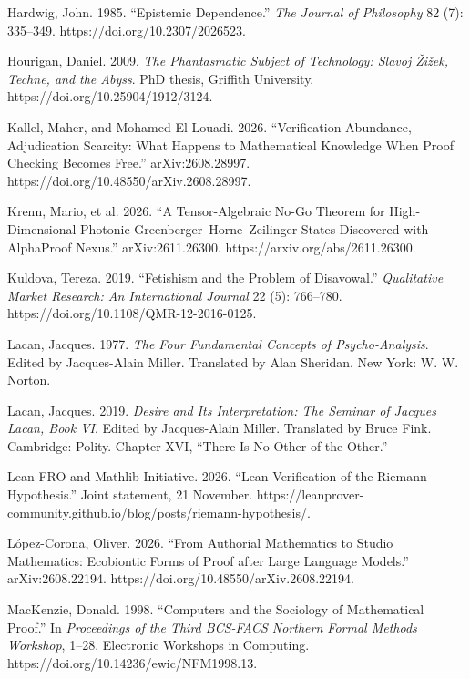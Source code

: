 \documentclass[sn-apa]{sn-jnl}
\begin{document}
\noindent\hangindent=0.5in Hardwig, John. 1985. “Epistemic Dependence.” \emph{The Journal of Philosophy} 82 (7): 335–349. https://doi.org/10.2307/2026523.\par\medskip
\noindent\hangindent=0.5in Hourigan, Daniel. 2009. \emph{The Phantasmatic Subject of Technology: Slavoj Žižek, Techne, and the Abyss}. PhD thesis, Griffith University. https://doi.org/10.25904/1912/3124.\par\medskip
\noindent\hangindent=0.5in Kallel, Maher, and Mohamed El Louadi. 2026. “Verification Abundance, Adjudication Scarcity: What Happens to Mathematical Knowledge When Proof Checking Becomes Free.” arXiv:2608.28997. https://doi.org/10.48550/arXiv.2608.28997.\par\medskip
\noindent\hangindent=0.5in Krenn, Mario, et al. 2026. “A Tensor-Algebraic No-Go Theorem for High-Dimensional Photonic Greenberger–Horne–Zeilinger States Discovered with AlphaProof Nexus.” arXiv:2611.26300. https://arxiv.org/abs/2611.26300.\par\medskip
\noindent\hangindent=0.5in Kuldova, Tereza. 2019. “Fetishism and the Problem of Disavowal.” \emph{Qualitative Market Research: An International Journal} 22 (5): 766–780. https://doi.org/10.1108/QMR-12-2016-0125.\par\medskip
\noindent\hangindent=0.5in Lacan, Jacques. 1977. \emph{The Four Fundamental Concepts of Psycho-Analysis}. Edited by Jacques-Alain Miller. Translated by Alan Sheridan. New York: W. W. Norton.\par\medskip
\noindent\hangindent=0.5in Lacan, Jacques. 2019. \emph{Desire and Its Interpretation: The Seminar of Jacques Lacan, Book VI}. Edited by Jacques-Alain Miller. Translated by Bruce Fink. Cambridge: Polity. Chapter XVI, “There Is No Other of the Other.”\par\medskip
\noindent\hangindent=0.5in Lean FRO and Mathlib Initiative. 2026. “Lean Verification of the Riemann Hypothesis.” Joint statement, 21 November. https://leanprover-community.github.io/blog/posts/riemann-hypothesis/.\par\medskip
\noindent\hangindent=0.5in López-Corona, Oliver. 2026. “From Authorial Mathematics to Studio Mathematics: Ecobiontic Forms of Proof after Large Language Models.” arXiv:2608.22194. https://doi.org/10.48550/arXiv.2608.22194.\par\medskip
\noindent\hangindent=0.5in MacKenzie, Donald. 1998. “Computers and the Sociology of Mathematical Proof.” In \emph{Proceedings of the Third BCS-FACS Northern Formal Methods Workshop}, 1–28. Electronic Workshops in Computing. https://doi.org/10.14236/ewic/NFM1998.13.\par\medskip
\end{document}

